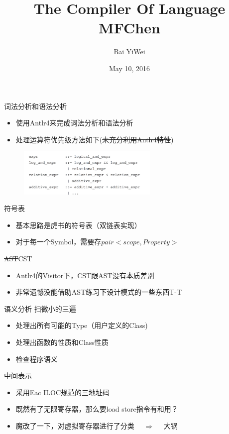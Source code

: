 \documentclass[UTF8]{beamer}
\title[ACM Class Compiler2016]{The Compiler Of Language MFChen}
\author{Bai YiWei}
\date{May 10, 2016}
\begin{document}
\begin{frame}
\titlepage
\end{frame}

\begin{frame}{词法分析和语法分析}
	\begin{itemize}
	\item 使用Antlr4来完成词法分析和语法分析
	\item 处理运算符优先级方法如下(\sout{未充分利用Antlr4特性})
	\end{itemize}
	\begin{figure}[!htb]
	\centering
	\includegraphics[width=0.6\textwidth]{1.png}
	\end{figure}
\end{frame}

\begin{frame}{符号表}
	\begin{itemize}
	\item 基本思路是虎书的符号表（双链表实现）
	\item 对于每一个Symbol，需要存$pair<scope, Property>$
	\end{itemize}
\end{frame}

\begin{frame}{\sout{AST}CST}
	\begin{itemize}
	\item Antlr4的Visitor下，CST跟AST没有本质差别
	\item 非常遗憾没能借助AST练习下设计模式的一些东西T-T
	\end{itemize}
\end{frame}

\begin{frame}{语义分析}
	扫微小的三遍
	\begin{itemize}
	\item 处理出所有可能的Type（用户定义的Class)
	\item 处理出函数的性质和Class性质
	\item 检查程序语义
	\end{itemize}
\end{frame}

\begin{frame}{中间表示}
	\begin{itemize}
	\item 采用Eac ILOC规范的三地址码
	\item 既然有了无限寄存器，那么要load store指令有和用？
	\item 魔改了一下，对虚拟寄存器进行了分类 $\quad \Rightarrow \quad$ 大锅
	\end{itemize}
\end{frame}
\end{document}
